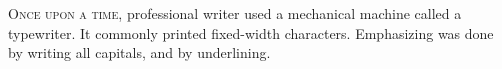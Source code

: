 \documentclass{book}
\begin{document}
\lettrine{O}{nce upon a time}, professional writer used
a mechanical machine called a typewriter. It commonly
printed fixed-width characters. Emphasizing was done by 
writing all capitals, and by underlining.
\end{document}
